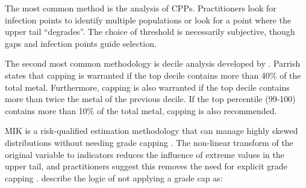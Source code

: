 The most common method is the analysis of \glspl{CPP}. Practitioners look for infection points to identify multiple populations or look for a point where the upper tail ``degrades''. The choice of threshold is necessarily subjective, though gaps and infection points guide selection.


The second most common methodology is decile analysis developed by \cite{parrish1997geologist}. Parrish states that capping is warranted if the top decile contains more than 40\% of the total metal. Furthermore, capping is also warranted if the top decile contains more than twice the metal of the previous decile. If the top percentile (99-100) contains more than 10\% of the total metal, capping is also recommended.



\Gls{MIK} is a risk-qualified estimation methodology that can manage highly skewed distributions without needing grade capping \citep{journel1983nonparametric}. The non-linear transform of the original variable to indicators reduces the influence of extreme values in the upper tail, and practitioners suggest this removes the need for explicit grade capping \citep{pretium2020, ngm2020, tristar2021, cardinal2019}. \cite{pretium2020} describe the logic of not applying a grade cap as:

